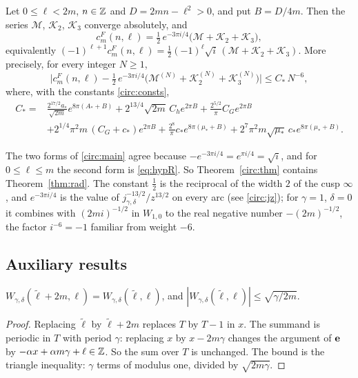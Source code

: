 \begin{theorem}\label{circ:thm}
Let $0\le\ell<2m$, $n\in\mathbb{Z}$ and $D=2mn-\ell^2>0$, and put $B=D/4m$. Then the series $\mathcal M$, $\mathcal K_2$, $\mathcal K_3$ converge absolutely, and
\begin{equation}\label{circ:main}
c^F_m(n,\ell)=\tfrac12\,e^{-3\pi i/4}\big(\mathcal M+\mathcal K_2+\mathcal K_3\big),
\end{equation}
equivalently $(-1)^{\ell+1}c^F_m(n,\ell)=\tfrac12(-1)^\ell\sqrt i\,(\mathcal M+\mathcal K_2+\mathcal K_3)$.
More precisely, for every integer $N\ge1$,
\begin{equation}\label{circ:errN}
\Big|c^F_m(n,\ell)-\tfrac12\,e^{-3\pi i/4}\big(\mathcal M^{(N)}+\mathcal K_2^{(N)}+\mathcal K_3^{(N)}\big)\Big|\le C_*\,N^{-6},
\end{equation}
where, with the constants \eqref{circ:consts},
\[
\begin{aligned}
C_*={}&\frac{2^{17/2}a_*}{\sqrt{2m}}e^{8\pi(A_*+B)}+2^{13/4}\sqrt{2m}\,C_he^{2\pi B}+\frac{2^{5/2}}\pi C_Ge^{2\pi B}\\
&+2^{1/4}\pi^2m\,(C_G+c_*)e^{2\pi B}+\frac{2^8}\pi c_*e^{8\pi(\mu_*+B)}+2^7\pi^2m\sqrt{\mu_*}\,c_*e^{8\pi(\mu_*+B)} .
\end{aligned}
\]
\end{theorem}

The two forms of \eqref{circ:main} agree because $-e^{-3\pi i/4}=e^{\pi i/4}=\sqrt i$, and for $0\le\ell\le m$ the second form is \eqref{eq:hypR}. So Theorem~\ref{circ:thm} contains Theorem~\ref{thm:rad}. The constant $\frac12$ is the reciprocal of the width $2$ of the cusp $\infty$, and $e^{-3\pi i/4}$ is the value of $j_{\gamma,\delta}^{-13/2}/z^{13/2}$ on every arc (see \eqref{circ:jz}); for $\gamma=1$, $\delta=0$ it combines with $(2mi)^{-1/2}$ in $W_{1,0}$ to the real negative number $-(2m)^{-1/2}$, the factor $i^{-6}=-1$ familiar from weight $-6$.

\subsection{Auxiliary results}

\begin{lemma}\label{circ:lem:weil}
$W_{\gamma,\delta}(\tilde\ell+2m,\ell)=W_{\gamma,\delta}(\tilde\ell,\ell)$, and $|W_{\gamma,\delta}(\tilde\ell,\ell)|\le\sqrt{\gamma/2m}$.
\end{lemma}

\begin{proof}
Replacing $\tilde\ell$ by $\tilde\ell+2m$ replaces $T$ by $T-1$ in $x$. The summand is periodic in $T$ with period $\gamma$: replacing $x$ by $x-2m\gamma$ changes the argument of $\mathbf e$ by $-\alpha x+\alpha m\gamma+\ell\in\mathbb{Z}$. So the sum over $T$ is unchanged. The bound is the triangle inequality: $\gamma$ terms of modulus one, divided by $\sqrt{2m\gamma}$.
\end{proof}

